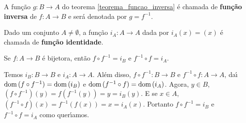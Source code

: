 \documentclass{beamer}
\begin{document}
    \begin{frame}
\begin{definicao}
    A fun\c{c}\~ao $g : B \to A$ do teorema \ref{teorema_funcao_inversa} \'e chamada de \textbf{fun\c{c}\~ao inversa} de $f : A \to B$ e ser\'a denotada por $g = f^{-1}$.
\end{definicao}


\begin{definicao}
    Dado um conjunto $A \ne \emptyset$, a fun{\c c}{\~a}o $i_{A}: A \to A$ dada por $i_{A}(x)=(x)$ {\'e} chamada de \textbf{fun{\c c}{\~a}o identidade}.
\end{definicao}
\end{frame}

    \begin{frame}

\begin{proposicao}
    Se $f : A \to B$ {\'e} bijetora, ent{\~a}o $f\circ f^{-1} = i_{B}$ e $f^{-1}\circ f = i_{A}$.
\end{proposicao}
\begin{prova}
    Temos $i_{B} : B \to B$ e $i_{A} : A \to A$. Al{\'e}m disso, $f\circ f^{-1} : B \to B$ e $f^{-1}\circ f : A \to A$, da{\'\i} ${\rm dom\,}(f\circ f^{-1}) = {\rm dom\,}(i_{B})$ e ${\rm dom\,}(f^{-1}\circ f) = {\rm dom\,}(i_{A})$. Agora, $y \in B$, $(f\circ f^{-1})(y) = f(f^{-1}(y)) = y = i_{B}(y)$. E se $x \in A$, $(f^{-1}\circ f)(x) = f^{-1}(f(x)) = x = i_{A}(x)$. Portanto $f\circ f^{-1} = i_{B}$ e $f^{-1}\circ f = i_{A}$ como quer{\'\i}amos.
\end{prova}
\end{frame}
\end{document}
